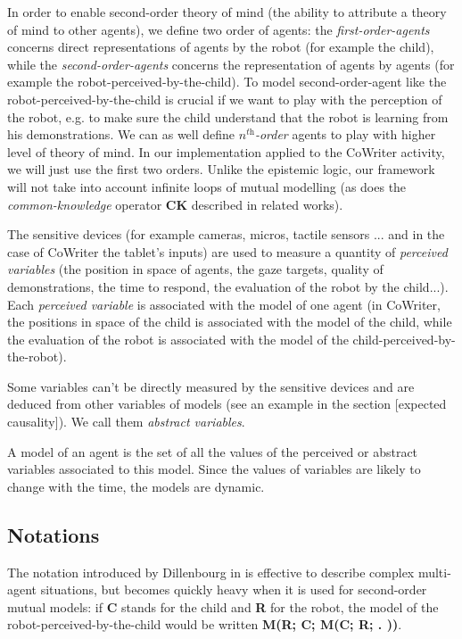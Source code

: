 \documentclass[10pt,a4paper,twocolumn]{article}
\begin{document}
In order to enable second-order theory of mind (the ability to attribute a theory of mind to other agents), we define two order of agents: the \textit{first-order-agents} concerns direct representations of agents by the robot (for example the child), while the \textit{second-order-agents} concerns the representation of agents by agents (for example the robot-perceived-by-the-child). To model second-order-agent like the robot-perceived-by-the-child is crucial if we want to play with the perception of the robot, e.g. to make sure the child understand that the robot is learning from his demonstrations. We can as well define \textit{$n^{\textit{th}}$-order} agents to play with higher level of theory of mind. In our implementation applied to the CoWriter activity, we will just use the first two orders. Unlike the epistemic logic, our framework will not take into account infinite loops of mutual modelling (as does the \textit{common-knowledge} operator \textbf{CK} described in related works). 

The sensitive devices (for example cameras, micros, tactile sensors ... and in the case of CoWriter the tablet's inputs) are used to measure a quantity of \textit{perceived variables} (the position in space of agents, the gaze targets, quality of demonstrations, the time to respond, the evaluation of the robot by the child...). Each \textit{perceived variable} is associated with the model of one agent (in CoWriter, the positions in space of the child is associated with the model of the child, while the evaluation of the robot is associated with the model of the child-perceived-by-the-robot). 

Some variables can't be directly measured by the sensitive devices and are deduced from other variables of models (see an example in the section [expected causality]). We call them \textit{abstract variables}. 

A model of an agent is the set of all the values of the perceived or abstract variables associated to this model. Since the values of variables are likely to change with the time, the models are dynamic.

\subsection{Notations}

The notation introduced by Dillenbourg in \cite{sangin2007partner} is effective to describe complex multi-agent situations, but becomes quickly heavy when it is used for second-order mutual models: if \textbf{C} stands for the child and \textbf{R} for the robot, the model of the robot-perceived-by-the-child would be written \textbf{M(R; C; M(C; R; . ))}.
\end{document}
